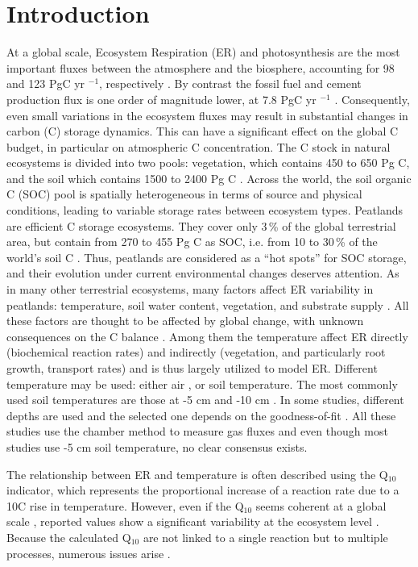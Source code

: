 \section{Introduction}
At a global scale, Ecosystem Respiration (ER) and photosynthesis are the most important fluxes between the atmosphere and the biosphere, accounting for 98 and 123 PgC yr $^{-1}$, respectively \citep{Bond-Lamberty2010,Beer2010}. 
By contrast the fossil fuel and cement production flux is one order of magnitude lower, at 7.8 PgC yr $^{-1}$ \citep{Ciais2014}.
Consequently, even small variations in the ecosystem fluxes may result in substantial changes in carbon (C) storage dynamics.
This can have a significant effect on the global C budget, in particular on atmospheric C concentration.
The C stock in natural ecosystems is divided into two pools: vegetation, which contains 450 to 650 Pg C, and the soil which contains 1500 to 2400 Pg C \citep{prentice2001,Eswaran1993,batjes1996}.
Across the world, the soil organic C (SOC) pool is spatially heterogeneous in terms of source and physical conditions, leading to variable storage rates between ecosystem types.
Peatlands are efficient C storage ecosystems.
They cover only 3\,\% of the global terrestrial area, but contain from 270 to 455 Pg C as SOC, i.e. from 10 to 30\,\% of the world's soil C \citep{gorham1991, turunen2002}.
Thus, peatlands are considered as a “hot spots” for SOC storage, and their evolution under current environmental changes deserves attention.
As in many other terrestrial ecosystems, many factors affect ER variability in peatlands: temperature, soil water content, vegetation, and substrate supply \citep{luo2006}.
All these factors are thought to be affected by global change, with unknown consequences on the C balance \citep{limpens2008}.
Among them the temperature affect ER directly (biochemical reaction rates) and indirectly (vegetation, and particularly root growth, transport rates) \citep{luo2006} and is thus largely utilized to model ER.
Different temperature may be used: either air \citep[e.g.,][]{bortoluzzi2006a}, or soil temperature.
The most commonly used soil temperatures are those at -5 cm \citep{ballantyne2014,gorres2014} and -10 cm \citep{kim1992,zhu2015}.
In some studies, different depths are used and the selected one depends on the goodness-of-fit \citep{gunther2014, zhu2015}.
All these studies use the chamber method to measure gas fluxes and even though most studies use -5 cm soil temperature, no clear consensus exists.

The relationship between ER and temperature is often described using the Q$_{10}$ indicator, which represents the proportional increase of a reaction rate due to a 10\textdegree C rise in temperature.
However, even if the Q$_{10}$ seems coherent at a global scale \citep{mahecha2010}, reported values show a significant variability at the ecosystem level \citep{graf2008}.
Because the calculated Q$_{10}$ are not linked to a single reaction but to multiple processes, numerous issues arise \citep{davidson2006}.

